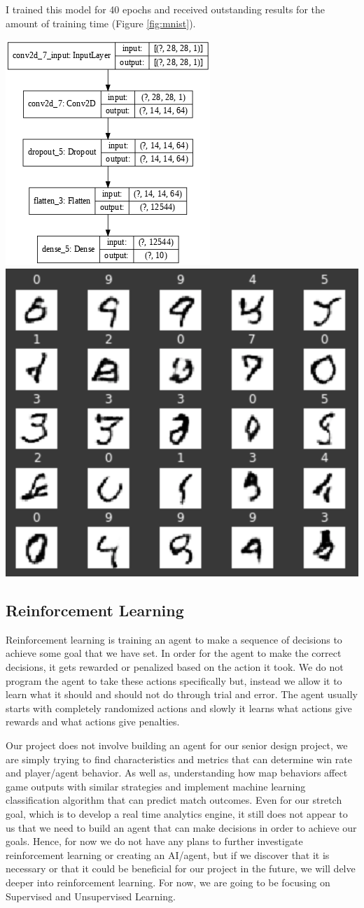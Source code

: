 \documentclass[a4paper,12pt]{report}
\begin{document}
I trained this model for 40 epochs and received outstanding results for the amount of training time (Figure \ref{fig:mnist}). 

\begin{center}
    \captionsetup{type=figure}
    \includegraphics[width=.3\linewidth]{media/mnist-classifier.png}
    \includegraphics[width=.38\linewidth]{media/generated-numbers.png}
    \label{fig:mnist}
\end{center}

\subsection{Reinforcement Learning}

Reinforcement learning is training an agent to make a sequence of decisions to achieve some goal that we have set. In order for the agent to make the correct decisions, it gets rewarded or penalized based on the action it took. We do not program the agent to take these actions specifically but, instead we allow it to learn what it should and should not do through trial and error. The agent usually starts with completely randomized actions and slowly it learns what actions give rewards and what actions give penalties.

Our project does not involve building an agent for our senior design project, we are simply trying to find characteristics and metrics that can determine win rate and player/agent behavior. As well as, understanding how map behaviors affect game outputs with similar strategies and implement machine learning classification algorithm that can predict match outcomes. Even for our stretch goal, which is to develop a real time analytics engine, it still does not appear to us that we need to build an agent that can make decisions in order to achieve our goals. Hence, for now we do not have any plans to further investigate reinforcement learning or creating an AI/agent, but if we discover that it is necessary or that it could be beneficial for our project in the future, we will delve deeper into reinforcement learning. For now, we are going to be focusing on Supervised and Unsupervised Learning.
\end{document}
